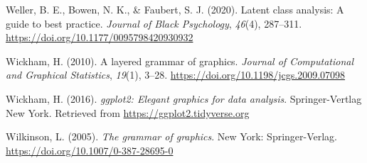 \documentclass[
  ,man,floatsintext]{apa6}
\newlength{\cslhangindent}
\newlength{\cslentryspacingunit} %
\newenvironment{CSLReferences}[2] %
 {%
  \setlength{\parindent}{0pt}
  \ifodd #1
  \let\oldpar\par
  \def\par{\hangindent=\cslhangindent\oldpar}
  \fi
  \setlength{\parskip}{#2\cslentryspacingunit}
 }%
 {}
\begin{document}
\begin{CSLReferences}{1}{0}
\leavevmode{}%
Weller, B. E., Bowen, N. K., \& Faubert, S. J. (2020). Latent class analysis: A guide to best practice. \emph{Journal of Black Psychology}, \emph{46}(4), 287--311. \url{https://doi.org/10.1177/0095798420930932}

\leavevmode{}%
Wickham, H. (2010). A layered grammar of graphics. \emph{Journal of Computational and Graphical Statistics}, \emph{19}(1), 3--28. \url{https://doi.org/10.1198/jcgs.2009.07098}

\leavevmode{}%
Wickham, H. (2016). \emph{ggplot2: Elegant graphics for data analysis}. Springer-Vertlag New York. Retrieved from \url{https://ggplot2.tidyverse.org}

\leavevmode{}%
Wilkinson, L. (2005). \emph{The grammar of graphics}. New York: Springer-Verlag. \url{https://doi.org/10.1007/0-387-28695-0}

\end{CSLReferences}
\end{document}
